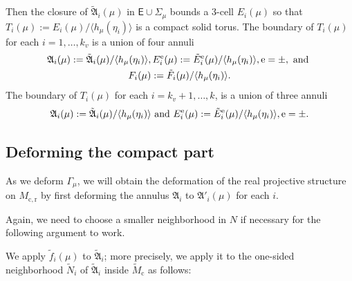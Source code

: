 \documentclass{amsart}
\numberwithin{equation}{section}
\newcommand\clo{{\rm Cl}}
\newcommand\eps{\epsilon}
\newcommand\Isom{{\mathbf{Isom}}}
\newcommand\Lspace{\mathsf E}
\theoremstyle{definition}
\theoremstyle{remark}
\newcommand{\rome}{\mathrm e}
\newcommand{\romec}{\mathrm{c}}
\newcommand{\romecr}{{\mathrm{c}, \mathrm{r}}}
\begin{document}

Then the closure of $\tilde {\mathfrak{A}}_i(\mu)$ in $\Lspace \cup \Sigma_\mu$ bounds
a $3$-cell $E_i(\mu)$ so that $T_i(\mu):= E_i(\mu)/\langle h_\mu(\eta_i)\rangle$ is a compact solid torus. 
The boundary of $T_i(\mu)$ for each $i=1, \dots, k_v$ is a union of four annuli 
\begin{multline} 
{\mathfrak{A}}_i(\mu):= \tilde {\mathfrak{A}}_i(\mu)/\langle h_\mu(\eta_i)\rangle, 
E_i^{\rome}(\mu):= \tilde E_i^{\rome}(\mu)/\langle h_\mu(\eta_i)\rangle, \rome=\pm,
\hbox{ and } \\ 
F_i(\mu):= \tilde F_i(\mu)/\langle h_\mu(\eta_i)\rangle. 
\end{multline}
The boundary of $T_i(\mu)$ for each $i=k_v+1, \dots, k$, is a union of three annuli 
\[{\mathfrak{A}}_i(\mu):= \tilde {\mathfrak{A}}_i(\mu)/\langle h_\mu(\eta_i)\rangle 
\hbox{ and } 
E_i^{\rome}(\mu):= \tilde E_i^{\rome}(\mu)/\langle h_\mu(\eta_i)\rangle,
\rome = \pm.\]




\subsection{Deforming the compact part} \label{sub:deform}

As we deform $\Gamma_\mu$, we will obtain the deformation of 
the real projective structure on $M_{\romecr}$ by first deforming the 
annulus ${\mathfrak{A}}_i$
to ${\mathfrak{A}}'_i(\mu)$ for each $i$. 

Again, we need to choose a smaller neighborhood in $N$ if necessary for the following argument to work. 

We apply $\tilde f_i(\mu)$ to $\tilde {\mathfrak{A}}_i$; 
more precisely, we apply it to the one-sided neighborhood 
$\tilde N_i$ of $\tilde {\mathfrak{A}}_i$ inside $\tilde M_\romec$ as follows: 

\end{document}
